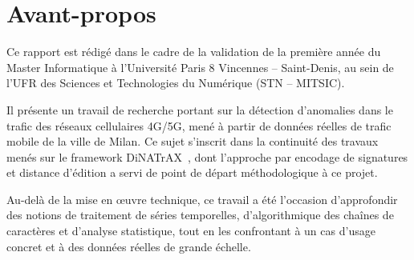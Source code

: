 \chapter*{Avant-propos}

Ce rapport est rédigé dans le cadre de la validation de la première
année du Master Informatique à l'Université Paris 8 Vincennes -- Saint-Denis,
au sein de l'UFR des Sciences et Technologies du Numérique (STN --
MITSIC).

Il présente un travail de recherche portant sur la détection
d'anomalies dans le trafic des réseaux cellulaires 4G/5G, mené à partir
de données réelles de trafic mobile de la ville de Milan. Ce sujet
s'inscrit dans la continuité des travaux menés sur le framework
DiNATrAX~\parencite{maudoux2024dinatrax}, dont l'approche par
encodage de signatures et distance d'édition a servi de point de départ
méthodologique à ce projet.

Au-delà de la mise en \oe uvre technique, ce travail a été l'occasion
d'approfondir des notions de traitement de séries temporelles,
d'algorithmique des chaînes de caractères et d'analyse statistique,
tout en les confrontant à un cas d'usage concret et à des données
réelles de grande échelle.
